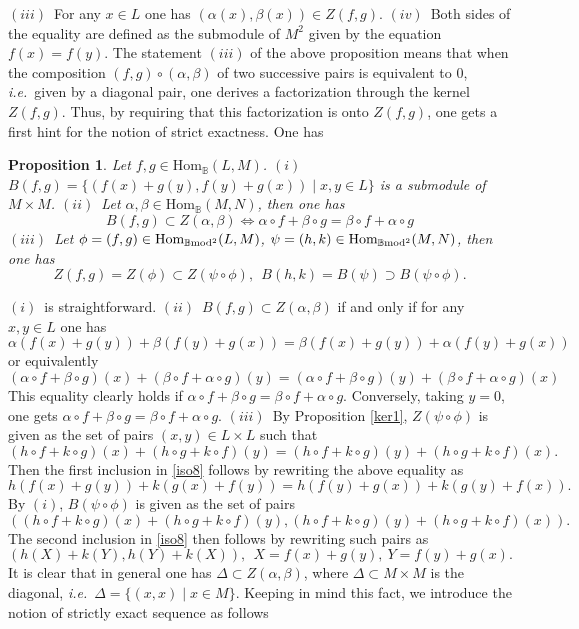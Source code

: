 \documentclass[12pt]{article}
\newtheorem{prop}[thm]{Proposition}
\def\Hom{{\rm Hom}}
\def\B{{\mathbb B}}
\def\strg{strict }
\def\strgly{strictly }
\newcommand{\ie}{{\it i.e.\/}\ }
\def\Hom {{\mbox{Hom}}}
\def\bm2{{\rm \B mod^2}}
\begin{document}
$(iii)$~For any $x\in L$ one has $(\alpha(x),\beta(x))\in Z(f,g)$.
\newline
$(iv)$~Both sides of the equality are defined as the submodule of $M^2$ given by the equation $f(x)=f(y)$. \endproof 
The statement $(iii)$ of the above proposition means that when the composition $(f,g)\circ (\alpha,\beta)$  of two successive pairs is equivalent to $0$, \ie given by a diagonal pair, one derives a factorization through the kernel $Z(f,g)$. Thus, by requiring that this factorization is onto $Z(f,g)$, one gets a first hint for the notion of \strg exactness. One has
\begin{prop}\label{coker1} Let $f,g\in \Hom_\B(L,M)$. \newline
$(i)$~$B(f,g)=\{(f(x)+g(y),f(y)+g(x))\mid x,y\in L\}$ is a submodule of $M\times M$. \newline 
$(ii)$~Let $\alpha,\beta\in \Hom_\B(M,N)$, then one has
\begin{equation}\label{exactcomp}
	B(f,g)\subset Z(\alpha,\beta)\iff \alpha\circ f+ \beta\circ g= \beta\circ f+ \alpha\circ g
\end{equation}	
$(iii)$~Let $\phi=(f,g)\in \Hom_\bm2(L,M)$, $\psi=(h,k)\in \Hom_\bm2(M,N)$,
then one has 
\begin{equation}\label{iso8}
	Z(f,g)=Z(\phi)\subset Z(\psi\circ \phi), \ \ B(h,k)=B(\psi)\supset B(\psi\circ \phi).
\end{equation}	

\end{prop}
\proof $(i)$~is straightforward. \newline
$(ii)$~$B(f,g)\subset Z(\alpha,\beta)$ if and only if for any $x,y\in L$ one has
$$
\alpha(f(x)+g(y))+\beta(f(y)+g(x))=\beta(f(x)+g(y))+\alpha(f(y)+g(x))
$$
or equivalently 
$$
(\alpha\circ f+ \beta\circ g)(x)+(\beta\circ f+ \alpha\circ g)(y)=
(\alpha\circ f+ \beta\circ g)(y)+(\beta\circ f+ \alpha\circ g)(x)
$$
This equality clearly holds if $\alpha\circ f+ \beta\circ g= \beta\circ f+ \alpha\circ g$. Conversely,  taking $y=0$, one gets $\alpha\circ f+ \beta\circ g= \beta\circ f+ \alpha\circ g$.\newline
$(iii)$~By Proposition \ref{ker1}, $Z(\psi\circ \phi)$ is given as the set of pairs $(x,y)\in L\times L$ such that 
$$
(h\circ f +k\circ g)(x)+ (h\circ g +k\circ f)(y)=(h\circ f +k\circ g)(y)+(h\circ g +k\circ f)(x).
$$
 Then the first inclusion in \eqref{iso8} follows by rewriting the above equality  as 
 $$
 h(f(x)+g(y))+k(g(x)+f(y))=h(f(y)+g(x))+k(g(y)+f(x)).
 $$
 By $(i)$, $B(\psi\circ \phi)$ is given as the set of pairs 
 $$
 \left( (h\circ f +k\circ g)(x)+ (h\circ g +k\circ f)(y),(h\circ f +k\circ g)(y)+(h\circ g +k\circ f)(x)\right).
 $$ 
 The second inclusion in \eqref{iso8} then follows by rewriting such pairs as 
 $$
 \left( h(X)+k(Y),h(Y)+k(X)\right), \  \  X=f(x)+g(y), \ Y=f(y)+g(x).
 $$
 \endproof 
 It is clear that in general one  has 
$\Delta\subset Z(\alpha,\beta)$, where $\Delta\subset M\times M$ is the diagonal, \ie $\Delta=\{(x,x)\mid x\in M\}$. Keeping in mind this fact, we introduce the notion of \strgly exact sequence as follows
\end{document}
